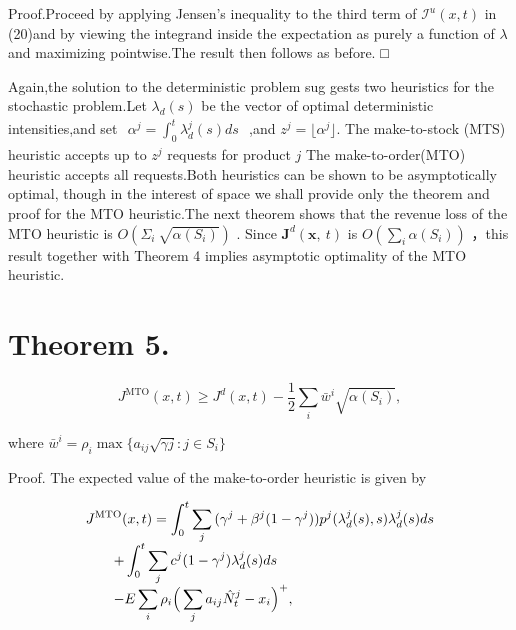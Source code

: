 Proof.Proceed by applying Jensen's inequality to the third term of
\(\mathcal { I } ^ { u } ( x , t )\) in (20)and by viewing the integrand
inside the expectation as purely a function of \(\lambda\) and
maximizing pointwise.The result then follows as before. □

Again,the solution to the deterministic problem sug gests two heuristics
for the stochastic problem.Let \(\lambda _ { d } ( s )\) be the vector
of optimal deterministic intensities,and set
\(\begin{array} { r } { \alpha ^ { j } = \int _ { 0 } ^ { t } \lambda _ { d } ^ { j } ( s ) d s } \end{array}\)
,and \(z ^ { j } = \lfloor \alpha ^ { j } \rfloor .\) The make-to-stock
(MTS) heuristic accepts up to \(z ^ { j }\) requests for product \(j\)
The make-to-order(MTO) heuristic accepts all requests.Both heuristics
can be shown to be asymptotically optimal, though in the interest of
space we shall provide only the theorem and proof for the MTO
heuristic.The next theorem shows that the revenue loss of the MTO
heuristic is \(O ( \Sigma _ { i } \ \sqrt { \alpha ( S _ { i } ) } )\) .
Since \(\boldsymbol { J } ^ { d } ( \boldsymbol { x } , \ t )\) is
\(O ( \sum _ { i } \alpha ( S _ { i } ) )\) ，this result together with
Theorem 4 implies asymptotic optimality of the MTO heuristic.

\section{Theorem 5.}\label{theorem-5.}

\[
J ^ { \mathrm { M T O } } ( x , t ) \geqslant J ^ { d } ( x , t ) - \frac { 1 } { 2 } \sum _ { i } \bar { w } ^ { i } \sqrt { \alpha ( S _ { i } ) } ,
\]

where
\(\bar { w } ^ { i } = \rho _ { i } \operatorname* { m a x } \{ a _ { i j } \sqrt { \gamma j } \colon j \in S _ { i } \}\)

Proof. The expected value of the make-to-order heuristic is given by

\[
\begin{array} { l l l } { \displaystyle { J ^ { \mathrm { M T O } } ( x , t ) = \int _ { 0 } ^ { t } \sum _ { j } { ( \gamma ^ { j } + \beta ^ { j } ( 1 - \gamma ^ { j } ) ) p ^ { j } ( \lambda _ { d } ^ { j } ( s ) , s ) \lambda _ { d } ^ { j } ( s ) d s } } } \\ { \displaystyle { \quad \quad + \int _ { 0 } ^ { t } \sum _ { j } { c ^ { j } ( 1 - \gamma ^ { j } ) \lambda _ { d } ^ { j } ( s ) d s } } } \\ { \displaystyle { \quad \quad - E \sum _ { i } { \rho _ { i } \Big ( \sum _ { j } { a _ { i j } \hat { N } _ { t } ^ { j } - x _ { i } } \Big ) ^ { + } } , } } \end{array}
\]

